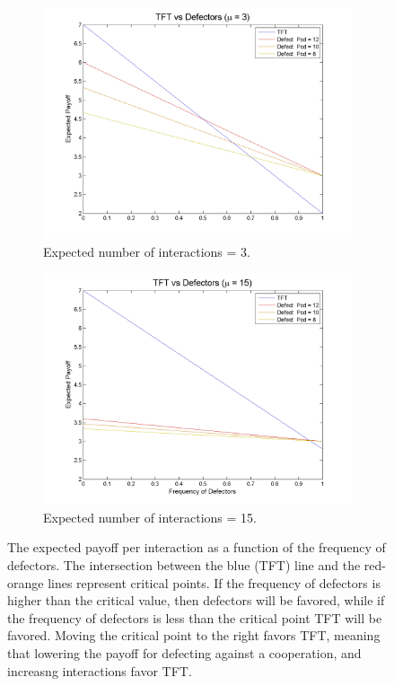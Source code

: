 \documentclass[11pt]{article} %
\begin{document}
\begin{figure}
	\begin{subfigure}[b]{0.55\textwidth}
		\centering
		\includegraphics[width=\textwidth]{files/figures/DvsTFT_mu3}
		\caption{Expected number of interactions = 3.}
	\end{subfigure}
	\begin{subfigure}[b]{0.55\textwidth}
		\centering
		\includegraphics[width=\textwidth]{files/figures/DvsTFT_mu15}
		\caption{Expected number of interactions = 15.}
	\end{subfigure}
	\caption{The expected payoff per interaction as a function of the frequency of defectors. The intersection
		    between the blue (TFT) line and the red-orange lines represent critical points. If the frequency
		    of defectors is higher than the critical value, then defectors will be favored, while if the
		   frequency of defectors is less than the critical point TFT will be favored. Moving the critical point
		  to the right favors TFT, meaning that lowering the payoff for defecting against a cooperation, and
	            increasng interactions favor TFT.}
\end{figure}
\end{document}
